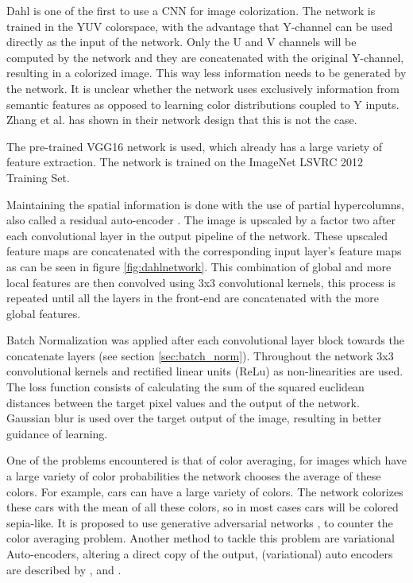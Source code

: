 Dahl \cite{Dahl} is one of the first to use a CNN for image colorization. The network is trained in the YUV colorspace, with the advantage that Y-channel can be used directly as the input of the network. Only the U and V channels will be computed by the network and they are concatenated with the original Y-channel, resulting in a colorized image. This way less information needs to be generated by the network. It is unclear whether the network uses exclusively information from semantic features as opposed to learning color distributions coupled to Y inputs. Zhang et al. \cite{Zhang} has shown in their network design that this is not the case. 

The pre-trained VGG16 network is used, which already has a large variety of feature extraction. The network is trained on the ImageNet LSVRC 2012 Training Set. 

Maintaining the spatial information is done with the use of partial hypercolumns, also called a residual auto-encoder \cite{hariharan2015hypercolumns}. The image is upscaled by a factor two after each convolutional layer in the output pipeline of the network. These upscaled feature maps are concatenated with the corresponding input layer's feature maps as can be seen in figure \ref{fig:dahlnetwork}. This combination of global and more local features are then convolved using 3x3 convolutional kernels, this process is repeated until all the layers in the front-end are concatenated with the more global features. 

Batch Normalization was applied after each convolutional layer block towards the concatenate layers (see section \ref{sec:batch_norm}). 
Throughout the network 3x3 convolutional kernels and rectified linear units (ReLu) \cite{nair2010rectified} as non-linearities are used. The loss function consists of calculating the sum of the squared euclidean distances between the target pixel values and the output of the network. 
Gaussian blur is used over the target output of the image, resulting in better guidance of learning. 

One of the problems encountered is that of color averaging, for images which have a large variety of color probabilities the network chooses the average of these colors. For example, cars can have a large variety of colors. 
The network colorizes these cars with the mean of all these colors, so in most cases cars will be colored sepia-like. It is proposed to use generative adversarial networks \cite{Radford}, to counter the color averaging problem. 
Another method to tackle this problem are variational Auto-encoders, altering a direct copy of the output, (variational) auto encoders are described by \cite{Gregor}, \cite{Kingma} and \cite{GoodfellowBOOK}. 


